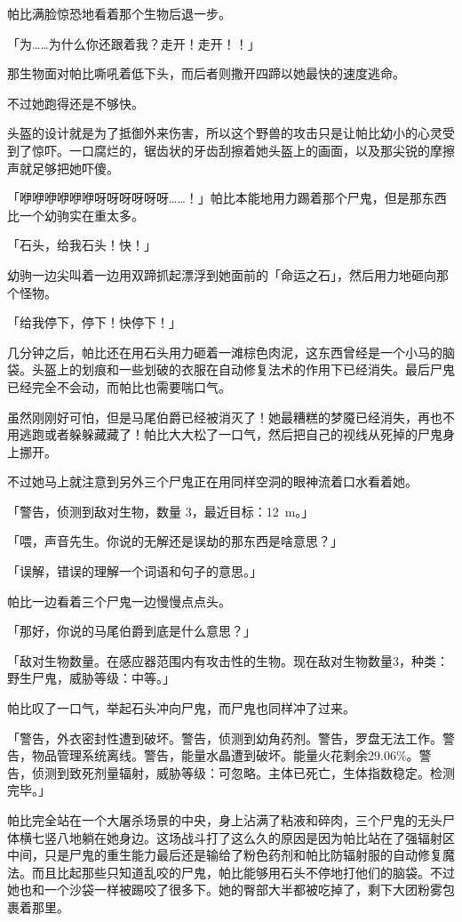 帕比满脸惊恐地看着那个生物后退一步。

「为……为什么你还跟着我？走开！走开！！」

那生物面对帕比嘶吼着低下头，而后者则撒开四蹄以她最快的速度逃命。

不过她跑得还是不够快。

头盔的设计就是为了抵御外来伤害，所以这个野兽的攻击只是让帕比幼小的心灵受到了惊吓。一口腐烂的，锯齿状的牙齿刮擦着她头盔上的画面，以及那尖锐的摩擦声就足够把她吓傻。

「咿咿咿咿咿咿呀呀呀呀呀呀……！」帕比本能地用力踢着那个尸鬼，但是那东西比一个幼驹实在重太多。

「石头，给我石头！快！」

幼驹一边尖叫着一边用双蹄抓起漂浮到她面前的「命运之石」，然后用力地砸向那个怪物。

「给我停下，停下！快停下！」

几分钟之后，帕比还在用石头用力砸着一滩棕色肉泥，这东西曾经是一个小马的脑袋。头盔上的划痕和一些划破的衣服在自动修复法术的作用下已经消失。最后尸鬼已经完全不会动，而帕比也需要喘口气。

虽然刚刚好可怕，但是马尾伯爵已经被消灭了！她最糟糕的梦魇已经消失，再也不用逃跑或者躲躲藏藏了！帕比大大松了一口气，然后把自己的视线从死掉的尸鬼身上挪开。

不过她马上就注意到另外三个尸鬼正在用同样空洞的眼神流着口水看着她。

「{\mt 警告，侦测到敌对生物，数量 3，最近目标：\SI{12}{m}。}」

「喂，声音先生。你说的无解还是误劫的那东西是啥意思？」

「{\mt 误解，错误的理解一个词语和句子的意思。}」

帕比一边看着三个尸鬼一边慢慢点点头。

「那好，你说的马尾伯爵到底是什么意思？」

「{\mt 敌对生物数量。在感应器范围内有攻击性的生物。现在敌对生物数量3，种类：野生尸鬼，威胁等级：中等。}」

帕比叹了一口气，举起石头冲向尸鬼，而尸鬼也同样冲了过来。

\horizonline


「{\mt 警告，外衣密封性遭到破坏。警告，侦测到幼角药剂。警告，罗盘无法工作。警告，物品管理系统离线。警告，能量水晶遭到破坏。能量火花剩余29.06\%。警告，侦测到致死剂量辐射，威胁等级：可忽略。主体已死亡，生体指数稳定。检测完毕。}」

帕比完全站在一个大屠杀场景的中央，身上沾满了粘液和碎肉，三个尸鬼的无头尸体横七竖八地躺在她身边。这场战斗打了这么久的原因是因为帕比站在了强辐射区中间，只是尸鬼的重生能力最后还是输给了粉色药剂和帕比防辐射服的自动修复魔法。而且比起那些只知道乱咬的尸鬼，帕比能够用石头不停地打他们的脑袋。不过她也和一个沙袋一样被踢咬了很多下。她的臀部大半都被吃掉了，剩下大团粉雾包裹着那里。

